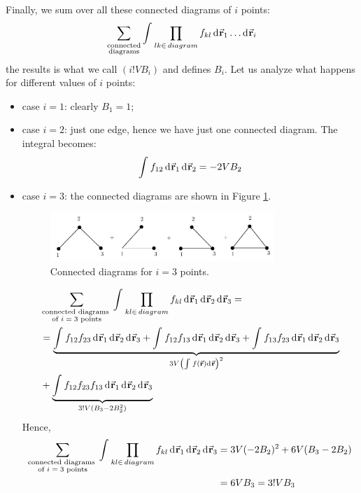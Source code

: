 \documentclass[../../Main/Main.tex]{subfiles}
\begin{document}
\noindent Finally, we sum over all these connected diagrams of \( i \) points:
\begin{equation*}
  \sum_{\substack{ \text{connected} \\  \text{diagrams} } }^{}    \int_{}^{} \prod_{lk \in \, diagram }^{} f_{kl} \dd[]{\va{r}_1} \dots \dd[]{\va{r}_i}
\end{equation*}
the results is what we call \( (i! V B_i) \) and defines \( B_i \). Let us analyze what happens for different values of \( i \) points:
\begin{itemize}
\item case \( i=1 \): clearly  \( B_1 =1 \);
\item case \( i=2 \): just one edge, hence we have just one connected diagram. The integral becomes:
\begin{equation*}
  \int_{}^{} f_{12} \dd[]{\va{r}_1} \dd[]{\va{r}_2} = - 2 V B_2
\end{equation*}
\item case \( i=3 \): the connected diagrams are shown in Figure \ref{fig:15_7}.
\begin{figure}[H]
\centering
\includegraphics[width=0.8\textwidth]{./img/10__1.pdf}
\caption{\label{fig:15_7} Connected diagrams for \( i=3 \) points.}
\end{figure}

\begin{equation*}
\begin{split}
  & \sum_{\substack{ \text{connected diagrams } \\ \text{of \( i=3 \) points}} }^{} \int_{}^{} \prod_{kl \in \, diagram }^{} f_{kl} \dd[]{\va{r}_1}   \dd[]{\va{r}_2}    \dd[]{\va{r}_3} = \\
   &=  \underbrace{ \int_{}^{} f_{12} f_{23} \dd[]{\va{r}_1} \dd[]{\va{r}_2} \dd[]{\va{r}_3}
    + \int_{}^{} f_{12}f_{13} \dd[]{\va{r}_1} \dd[]{\va{r}_2} \dd[]{\va{r}_3}
    + \int_{}^{} f_{13}f_{23} \dd[]{\va{r}_1} \dd[]{\va{r}_2} \dd[]{\va{r}_3} }_{3 V \qty(\int_{}^{} f (\va{r})\dd[]{\va{r}}  )^2 }   \\
  & + \underbrace{\int_{}^{} f_{12} f_{23} f_{13} \dd[]{\va{r}_1} \dd[]{\va{r}_2} \dd[]{\va{r}_3}}_{3! V (B_3 - 2 B_2^2)}
\end{split}
\end{equation*}
Hence,
\begin{equation*}
\begin{split}
  \sum_{\substack{ \text{connected diagrams } \\ \text{of \( i=3 \) points}} }^{} \int_{}^{} \prod_{kl \in \, diagram }^{} f_{kl} \dd[]{\va{r}_1}   \dd[]{\va{r}_2}    \dd[]{\va{r}_3}
  & = 3 V (-2B_2)^2 + 6V (B_3 - 2 B_2) \\
  & = 6V B_3 = 3! V B_3
\end{split}
\end{equation*}

\end{itemize}
\end{document}
